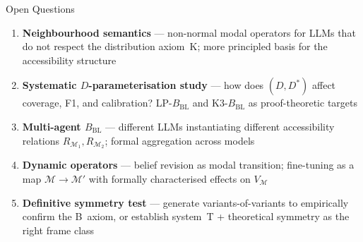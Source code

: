 \documentclass[aspectratio=169,9pt]{beamer}
\newcommand{\BBL}{{B_{\mathrm{BL}}}}
\begin{document}
\begin{frame}{Open Questions}

  \small
  \begin{enumerate}\setlength\itemsep{5pt}

    \item \textbf{Neighbourhood semantics} —
          non-normal modal operators for LLMs that do not respect the
          distribution axiom~K; more principled basis for the accessibility structure

    \item \textbf{Systematic $D$-parameterisation study} —
          how does $(D, D^*)$ affect coverage, F1, and calibration?
          LP-$\BBL$ and K3-$\BBL$ as proof-theoretic targets

    \item \textbf{Multi-agent $\BBL$} —
          different LLMs instantiating different accessibility relations
          $R_{\mathcal{M}_1}, R_{\mathcal{M}_2}$; formal aggregation across models

    \item \textbf{Dynamic operators} —
          belief revision as modal transition; fine-tuning as a map
          $\mathcal{M} \to \mathcal{M}'$ with formally characterised effects on $V_\mathcal{M}$

    \item \textbf{Definitive symmetry test} —
          generate variants-of-variants to empirically confirm the B~axiom,
          or establish system~T + theoretical symmetry as the right frame class

  \end{enumerate}

\end{frame}
\end{document}
